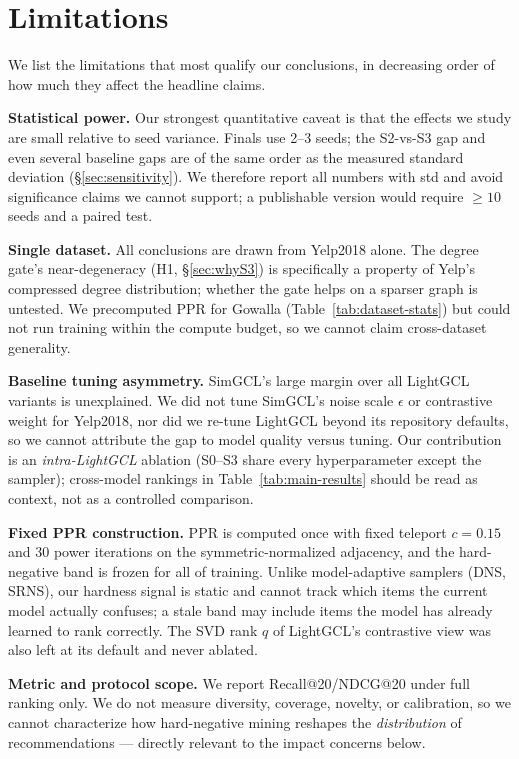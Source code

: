 \documentclass{article}
\begin{document}
\section{Limitations}
\label{sec:limitations}

We list the limitations that most qualify our conclusions, in decreasing order of how
much they affect the headline claims.

\textbf{Statistical power.} Our strongest quantitative caveat is that the effects we
study are small relative to seed variance. Finals use 2--3 seeds; the S2-vs-S3 gap and
even several baseline gaps are of the same order as the measured standard deviation
(\S\ref{sec:sensitivity}). We therefore report all numbers with std and avoid
significance claims we cannot support; a publishable version would require $\ge\!10$
seeds and a paired test.

\textbf{Single dataset.} All conclusions are drawn from Yelp2018 alone. The degree
gate's near-degeneracy (H1, \S\ref{sec:whyS3}) is specifically a property of Yelp's
compressed degree distribution; whether the gate helps on a sparser graph is untested.
We precomputed PPR for Gowalla (Table~\ref{tab:dataset-stats}) but could not run
training within the compute budget, so we cannot claim cross-dataset generality.

\textbf{Baseline tuning asymmetry.} SimGCL's large margin over all LightGCL variants is
unexplained. We did not tune SimGCL's noise scale $\epsilon$ or contrastive weight for
Yelp2018, nor did we re-tune LightGCL beyond its repository defaults, so we cannot
attribute the gap to model quality versus tuning. Our contribution is an
\emph{intra-LightGCL} ablation (S0--S3 share every hyperparameter except the sampler);
cross-model rankings in Table~\ref{tab:main-results} should be read as context, not as
a controlled comparison.

\textbf{Fixed PPR construction.} PPR is computed once with fixed teleport $c{=}0.15$ and
$30$ power iterations on the symmetric-normalized adjacency, and the hard-negative band
is frozen for all of training. Unlike model-adaptive samplers (DNS, SRNS), our hardness
signal is static and cannot track which items the current model actually confuses; a
stale band may include items the model has already learned to rank correctly. The SVD
rank $q$ of LightGCL's contrastive view was also left at its default and never ablated.

\textbf{Metric and protocol scope.} We report Recall@20/NDCG@20 under full ranking only.
We do not measure diversity, coverage, novelty, or calibration, so we cannot
characterize how hard-negative mining reshapes the \emph{distribution} of
recommendations --- directly relevant to the impact concerns below.
\end{document}
